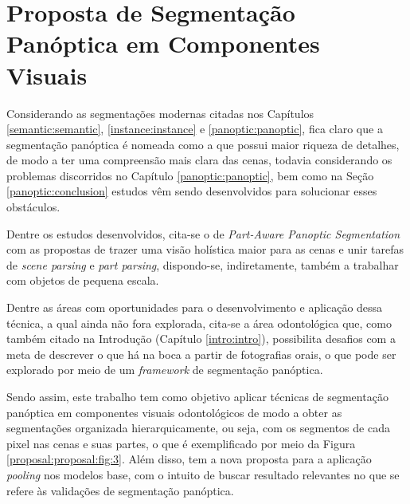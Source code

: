 \newpage
\clearpage

\section{Proposta de Segmentação Panóptica em Componentes Visuais}
\label{proposal:proposal}

Considerando as segmentações modernas citadas nos Capítulos \ref{semantic:semantic}, \ref{instance:instance} e \ref{panoptic:panoptic}, fica claro que a segmentação panóptica é nomeada como a que possui maior riqueza de detalhes, de modo a ter uma compreensão mais clara das cenas, todavia considerando os problemas discorridos no Capítulo \ref{panoptic:panoptic}, bem como na Seção \ref{panoptic:conclusion} estudos vêm sendo desenvolvidos para solucionar esses obstáculos.

\begin{sloppypar}
Dentre os estudos desenvolvidos, cita-se o de \textit{Part-Aware Panoptic Segmentation} \cite{DeGeus2021} com as propostas de trazer uma visão holística maior para as cenas e unir tarefas de \textit{scene parsing} e \textit{part parsing}, dispondo-se, indiretamente, também a trabalhar com objetos de pequena escala.
\end{sloppypar}

Dentre as áreas com oportunidades para o desenvolvimento e aplicação dessa técnica, a qual ainda não fora explorada, cita-se a área odontológica que, como também citado na Introdução (Capítulo \ref{intro:intro}), possibilita desafios com a meta de descrever o que há na boca a partir de fotografias orais, o que pode ser explorado por meio de um \textit{framework} de segmentação panóptica.

Sendo assim, este trabalho tem como objetivo aplicar técnicas de segmentação panóptica em componentes visuais odontológicos de modo a obter as segmentações organizada hierarquicamente, ou seja, com os segmentos de cada pixel nas cenas e suas partes, o que é exemplificado por meio da Figura \ref{proposal:proposal:fig:3}. Além disso, tem a nova proposta para a aplicação \textit{pooling} nos modelos base, com o intuito de buscar resultado relevantes no que se refere às validações de segmentação panóptica.

